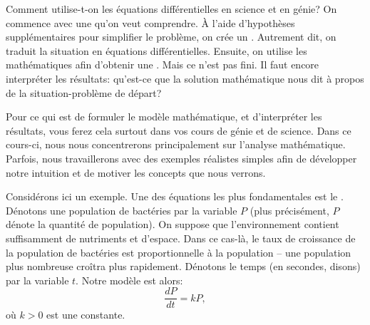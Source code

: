 Comment utilise-t-on les équations différentielles en science et en génie?  On commence avec une \emph{} qu'on veut comprendre.  À l'aide d'hypothèses supplémentaires pour simplifier le problème, on crée un 
\emph{}.  Autrement dit, on traduit la situation en équations différentielles.  Ensuite, on utilise les mathématiques afin d'obtenir une \emph{}.  Mais ce n'est pas fini.  Il faut encore interpréter les résultats: qu'est-ce que la solution mathématique nous dit à propos de la situation-problème de départ?

Pour ce qui est de formuler le modèle mathématique, et d'interpréter les résultats, vous ferez cela surtout dans vos cours de génie et de science.  Dans ce cours-ci, nous nous concentrerons principalement sur l'analyse mathématique.  Parfois, nous travaillerons avec des exemples réalistes simples afin de développer notre intuition et de motiver les concepts que nous verrons.

Considérons ici un exemple.  Une des équations les plus fondamentales est le \emph{}.  Dénotons une population de bactéries par la variable $P$ (plus précisément, $P$ dénote la quantité de population).  On suppose que l'environnement contient suffisamment de nutriments et d'espace.  Dans ce cas-là, le taux de croissance de la population de bactéries est proportionnelle à la population -- une population plus nombreuse cro\^itra plus rapidement.  Dénotons le temps (en secondes, disons) par la variable $t$.  Notre modèle est alors: 
%
\begin{equation*}
\frac{dP}{dt} = kP, 
\end{equation*}
où $k > 0$ est une constante.

